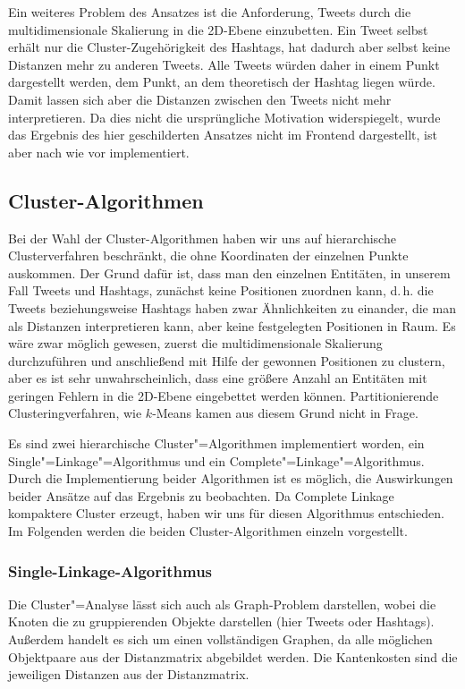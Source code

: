 Ein wei\-te\-res Problem des Ansatzes ist die Anforderung, 
Tweets durch die multidimensionale Skalierung in die 2D-Ebene 
einzubetten. Ein Tweet selbst erhält nur die 
Cluster-Zugehörigkeit des Hashtags, hat dadurch aber selbst keine Distanzen mehr zu anderen Tweets. 
Alle Tweets würden daher in einem Punkt dargestellt werden, 
dem Punkt, an dem theoretisch der Hashtag liegen würde. 
 Damit lassen sich aber die Distanzen 
zwi\-schen den Tweets nicht mehr interpretieren. Da dies nicht 
die ursprüngliche Motivation widerspiegelt, wurde das Ergebnis 
des hier geschilderten Ansatzes nicht im Frontend dargestellt, 
ist aber nach wie vor implementiert. 


\subsection{Cluster-Algorithmen} \label{subsec:ClusterAlgorithmen}

Bei der Wahl der Cluster-Algorithmen haben wir uns auf hierarchische Clusterverfahren 
beschränkt, die ohne Koordinaten der einzelnen Punkte auskommen. 
Der Grund dafür ist, dass man den einzelnen Entitäten, in unserem Fall
Tweets und Hashtags, zunächst keine Positionen zuordnen kann, d.\,h. die Tweets beziehungsweise Hashtags 
haben zwar Ähnlichkeiten zu einander, die man als Distanzen interpretieren kann, aber keine festgelegten 
Positionen in Raum. Es wäre zwar möglich gewesen, zuerst die multidimensionale Skalierung durchzuführen
und anschließend mit Hilfe der gewonnen Positionen zu clustern, aber es ist sehr unwahrscheinlich,
dass eine größere Anzahl an Entitäten mit geringen Fehlern in die 2D-Ebene eingebettet werden können.
Partitionierende Clusteringverfahren, wie $k$-Means \cite{Llo1982} kamen aus diesem Grund nicht in Frage.

Es sind zwei hierarchische Cluster"=Algorithmen implementiert worden, ein Single"=Linkage"=Algorithmus und ein
Complete"=Linkage"=Algorithmus. 
Durch die Implementierung beider Algorithmen ist es möglich, die Auswirkungen beider Ansätze auf das Ergebnis zu beobachten. Da Complete Linkage kompaktere
Cluster erzeugt, haben wir uns für diesen Algorithmus entschieden. Im Folgenden werden die 
beiden Cluster-Algorithmen einzeln vorgestellt.

\subsubsection{Single-Linkage-Algorithmus}
Die Cluster"=Analyse lässt sich auch als Graph-Problem darstellen, wobei die Knoten die zu gruppierenden Objekte darstellen (hier Tweets oder Hashtags). Außerdem handelt es sich um einen vollständigen Graphen, da alle möglichen Objektpaare aus der Distanzmatrix abgebildet werden. Die Kantenkosten sind die jeweiligen Distanzen aus der Distanzmatrix. 

